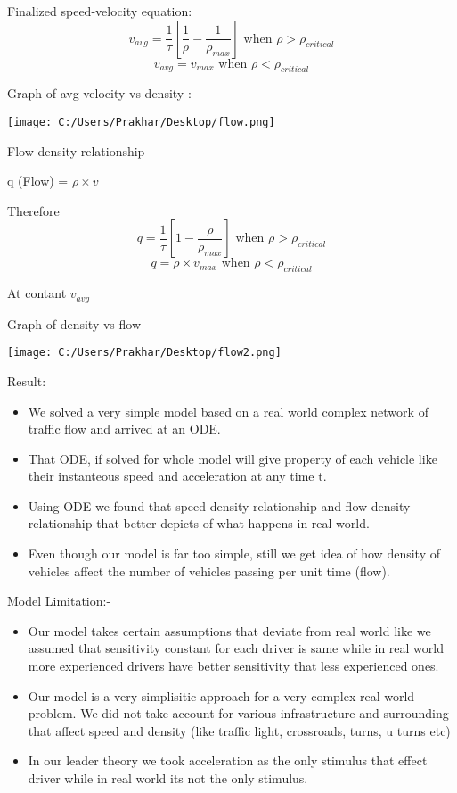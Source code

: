 \documentclass[12pt, letterpaper]{article}
\begin{document}
Finalized speed-velocity equation:
 \begin{equation}
  v_{avg} = \frac{1}{\tau}[\frac{1}{\rho} - \frac{1}{\rho_{max}}]   \textrm{ when $\rho > \rho_{critical}$}
    \end{equation}
     \begin{equation}
  v_{avg} = v_{max} \textrm{ when $\rho < \rho_{critical}$}
  \end{equation}

Graph of avg velocity vs density :

 \texttt{[image: C:/Users/Prakhar/Desktop/flow.png]}
 
 Flow density relationship - 
 
 q (Flow) = $\rho \times  v$
 
 Therefore 
 \begin{equation}
   q = \frac{1}{\tau}[1 - \frac{\rho}{\rho_{max}}]   \textrm{ when $\rho > \rho_{critical}$}
    \end{equation}
     \begin{equation}
  q = \rho  \times v_{max} \textrm{ when $\rho < \rho_{critical}$}
  \end{equation}
  
  At contant $v_{avg}$
  
  Graph of density vs flow
  
  
\texttt{[image: C:/Users/Prakhar/Desktop/flow2.png]}

Result:
\begin{itemize}
\item We solved a very simple model based on a real world complex network of traffic flow and arrived at an ODE.
\item That ODE, if solved for whole model will give property of each vehicle like their instanteous speed and acceleration at any time t.
\item Using ODE we found that speed density relationship and flow density relationship that better depicts of what happens in real world.
\item Even though our model is far too simple, still we get idea of how density of vehicles affect the number of vehicles passing per unit time (flow).  
\end{itemize}
Model Limitation:-
\begin {itemize}
\item Our model takes certain assumptions that deviate from real world like we assumed that sensitivity constant for each driver is same while in real world more experienced drivers have better sensitivity that less experienced ones.
\item Our model is a very simplisitic approach for a very complex real world problem. We did not take account for various infrastructure and surrounding that affect speed and density (like traffic light, crossroads, turns, u turns etc)
\item In our leader theory we took acceleration as the only stimulus that effect driver while in real world its not the only stimulus. 
\end{itemize}
\end{document}
